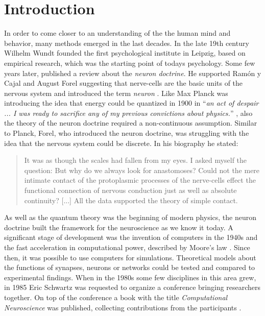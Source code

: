 \section{Introduction}

In order to come closer to an understanding of the the human mind and behavior, many methods emerged in the last decades. In the late 19th century Wilhelm Wundt founded the first psychological institute in Leipzig, based on empirical research, which was the starting point of todays psychology. Some few years later, \textcite{waldeyer1891ueber} published a review about the \emph{neuron doctrine}. He supported Ramón y Cajal and August Forel suggesting that nerve-cells are the basic units of the nervous system and introduced the term \emph{neuron} \parencite{finger2001origins}. Like Max Planck was introducing the idea that energy could be quantized in 1900 in ``\emph{an act of despair ... I was ready to sacrifice any of my previous convictions about physics.}'' \parencite{baddeley2008physics}, also the theory of the neuron doctrine required a non-continuous assumption. Similar to Planck, Forel, who introduced the neuron doctrine, was struggling with the idea that the nervous system could be discrete. In his biography he stated:

\begin{quote}
It was as though the scales had fallen from my eyes. I asked myself the question: But why do we always look for anastomoses? Could not the mere intimate contact of the protoplasmic processes of the nerve-cells effect the functional connection of nervous conduction just as well as absolute continuity? [...] All the data supported the theory of simple contact. \parencite{finger2001origins}
\end{quote}

As well as the quantum theory was the beginning of modern physics, the neuron doctrine built the framework for the neuroscience as we know it today. A significant stage of development was the invention of computers in the 1940s and the fast acceleration in computational power, described by Moore's law \parencite{moore1998cramming}. Since then, it was possible to use computers for simulations. Theoretical models about the functions of synapses, neurons or networks could be tested and compared to experimental findings. When in the 1980s some few disciplines in this area grew, in 1985 Eric Schwartz was requested to organize a conference bringing researchers together. On top of the conference a book with the title \emph{Computational Neuroscience} was published, collecting contributions from the participants \parencite{schwartz1993computational}.

